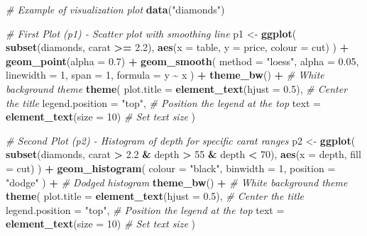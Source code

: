 \documentclass[
  12pt,
]{article}
\newenvironment{Shaded}{\begin{snugshade}}{\end{snugshade}}
\newcommand{\AttributeTok}[1]{\textcolor[rgb]{0.13,0.29,0.53}{#1}}
\newcommand{\CommentTok}[1]{\textcolor[rgb]{0.56,0.35,0.01}{\textit{#1}}}
\newcommand{\DecValTok}[1]{\textcolor[rgb]{0.00,0.00,0.81}{#1}}
\newcommand{\FloatTok}[1]{\textcolor[rgb]{0.00,0.00,0.81}{#1}}
\newcommand{\FunctionTok}[1]{\textcolor[rgb]{0.13,0.29,0.53}{\textbf{#1}}}
\newcommand{\NormalTok}[1]{#1}
\newcommand{\OtherTok}[1]{\textcolor[rgb]{0.56,0.35,0.01}{#1}}
\newcommand{\SpecialCharTok}[1]{\textcolor[rgb]{0.81,0.36,0.00}{\textbf{#1}}}
\newcommand{\StringTok}[1]{\textcolor[rgb]{0.31,0.60,0.02}{#1}}
\begin{document}
\begin{Shaded}
\begin{Highlighting}[]
\CommentTok{\# Example of visualization plot}
\FunctionTok{data}\NormalTok{(}\StringTok{"diamonds"}\NormalTok{)}

\CommentTok{\# First Plot (p1) {-} Scatter plot with smoothing line}
\NormalTok{p1 }\OtherTok{\textless{}{-}} \FunctionTok{ggplot}\NormalTok{(}
  \FunctionTok{subset}\NormalTok{(diamonds, carat }\SpecialCharTok{\textgreater{}=} \FloatTok{2.2}\NormalTok{),}
  \FunctionTok{aes}\NormalTok{(}\AttributeTok{x =}\NormalTok{ table, }\AttributeTok{y =}\NormalTok{ price, }\AttributeTok{colour =}\NormalTok{ cut)}
\NormalTok{) }\SpecialCharTok{+}
  \FunctionTok{geom\_point}\NormalTok{(}\AttributeTok{alpha =} \FloatTok{0.7}\NormalTok{) }\SpecialCharTok{+}
  \FunctionTok{geom\_smooth}\NormalTok{(}
    \AttributeTok{method =} \StringTok{"loess"}\NormalTok{, }\AttributeTok{alpha =} \FloatTok{0.05}\NormalTok{,}
    \AttributeTok{linewidth =} \DecValTok{1}\NormalTok{, }\AttributeTok{span =} \DecValTok{1}\NormalTok{, }\AttributeTok{formula =}\NormalTok{ y }\SpecialCharTok{\textasciitilde{}}\NormalTok{ x}
\NormalTok{  ) }\SpecialCharTok{+}
  \FunctionTok{theme\_bw}\NormalTok{() }\SpecialCharTok{+} \CommentTok{\# White background theme}
  \FunctionTok{theme}\NormalTok{(}
    \AttributeTok{plot.title =} \FunctionTok{element\_text}\NormalTok{(}\AttributeTok{hjust =} \FloatTok{0.5}\NormalTok{), }\CommentTok{\# Center the title}
    \AttributeTok{legend.position =} \StringTok{"top"}\NormalTok{, }\CommentTok{\# Position the legend at the top}
    \AttributeTok{text =} \FunctionTok{element\_text}\NormalTok{(}\AttributeTok{size =} \DecValTok{10}\NormalTok{) }\CommentTok{\# Set text size}
\NormalTok{  )}

\CommentTok{\# Second Plot (p2) {-} Histogram of depth for specific carat ranges}
\NormalTok{p2 }\OtherTok{\textless{}{-}} \FunctionTok{ggplot}\NormalTok{(}
  \FunctionTok{subset}\NormalTok{(diamonds, carat }\SpecialCharTok{\textgreater{}} \FloatTok{2.2} \SpecialCharTok{\&}\NormalTok{ depth }\SpecialCharTok{\textgreater{}} \DecValTok{55} \SpecialCharTok{\&}\NormalTok{ depth }\SpecialCharTok{\textless{}} \DecValTok{70}\NormalTok{),}
  \FunctionTok{aes}\NormalTok{(}\AttributeTok{x =}\NormalTok{ depth, }\AttributeTok{fill =}\NormalTok{ cut)}
\NormalTok{) }\SpecialCharTok{+}
  \FunctionTok{geom\_histogram}\NormalTok{(}
    \AttributeTok{colour =} \StringTok{"black"}\NormalTok{,}
    \AttributeTok{binwidth =} \DecValTok{1}\NormalTok{, }\AttributeTok{position =} \StringTok{"dodge"}
\NormalTok{  ) }\SpecialCharTok{+} \CommentTok{\# Dodged histogram}
  \FunctionTok{theme\_bw}\NormalTok{() }\SpecialCharTok{+} \CommentTok{\# White background theme}
  \FunctionTok{theme}\NormalTok{(}
    \AttributeTok{plot.title =} \FunctionTok{element\_text}\NormalTok{(}\AttributeTok{hjust =} \FloatTok{0.5}\NormalTok{), }\CommentTok{\# Center the title}
    \AttributeTok{legend.position =} \StringTok{"top"}\NormalTok{, }\CommentTok{\# Position the legend at the top}
    \AttributeTok{text =} \FunctionTok{element\_text}\NormalTok{(}\AttributeTok{size =} \DecValTok{10}\NormalTok{) }\CommentTok{\# Set text size}
\NormalTok{  )}


\end{Highlighting}
\end{Shaded}
\end{document}
